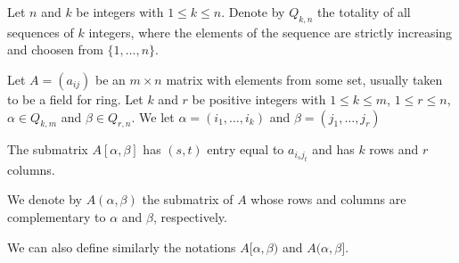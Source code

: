 \documentclass[12pt]{article}
\begin{document}
Let $n$ and $k$ be integers with $1 \leq k \leq n$. Denote by
$Q_{k,n}$ the totality  of all sequences of $k$ integers, where the elements of
the sequence are strictly increasing and choosen from $\{1, \ldots , n\}$.


Let $A=(a_{ij})$ be an $m \times n$ matrix with elements from some set, usually
taken to be a field for ring. Let  $k$ and $r$ be positive integers with
$1 \leq k \leq m$, $1 \leq r \leq n$, $ \alpha \in Q_{k,m}$ and
$ \beta \in Q_{r,n}$. 
We let $ \alpha = (i_1, \ldots , i_k)$ and $ \beta =(j_1, \ldots , j_r)$

The submatrix $A[\alpha, \beta]$ has $(s,t)$ entry equal to
$a_{i_sj_t}$ and has $k$ rows and $r$ columns. 

We denote by  $A(\alpha, \beta)$ the submatrix of $A$ whose rows  and columns
are complementary to $\alpha $ and $\beta$, respectively.
 
We can also define similarly the notations $A[\alpha, \beta)$ and $A(\alpha, \beta]$.

\end{document}
